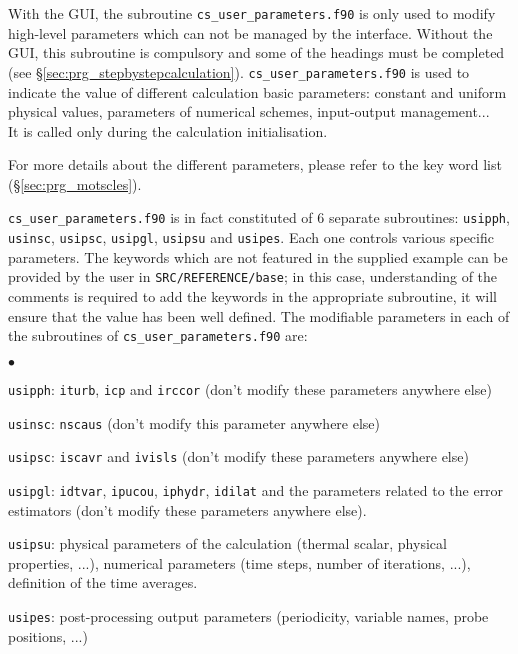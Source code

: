 {{With the GUI, the subroutine \texttt{cs\_user\_parameters.f90} is only
used to modify high-level parameters which can not be managed by the
interface. Without the GUI, this
subroutine is compulsory and some of the headings must be completed (see \S\ref{sec:prg_stepbystepcalculation}).
\texttt{cs\_user\_parameters.f90}
is used to indicate the value of different calculation
basic parameters: constant and uniform physical values, parameters of
numerical schemes, input-output management...\\
It is called only during the calculation initialisation.

For more details about the different parameters, please refer to the key
word list (\S\ref{sec:prg_motscles}).

\texttt{cs\_user\_parameters.f90} is in fact constituted of 6 separate subroutines:  \texttt{usipph},
 \texttt{usinsc}, \texttt{usipsc}, \texttt{usipgl},
\texttt{usipsu} and \texttt{usipes}. Each one controls various
 specific parameters. The keywords which are not featured in the supplied example
can be provided by the user in \texttt{SRC/REFERENCE/base}; in this case,
understanding of the comments is required to add the keywords in the appropriate
subroutine, it will ensure that the value
has been well defined. The modifiable parameters in each of the subroutines of
\texttt{cs\_user\_parameters.f90} are:

\begin{list}{$\bullet$}{}
\item \texttt{usipph}: \texttt{iturb}, \texttt{icp} and \texttt{irccor} (don't modify these
      parameters anywhere else)
\item \texttt{usinsc}: \texttt{nscaus} (don't modify this parameter anywhere
      else)
\item \texttt{usipsc}: \texttt{iscavr} and \texttt{ivisls} (don't modify these
      parameters anywhere else)
\item \texttt{usipgl}: \texttt{idtvar}, \texttt{ipucou}, \texttt{iphydr}, \texttt{idilat} and the
      parameters related to the error estimators (don't modify these parameters
      anywhere else).
\item \texttt{usipsu}: physical parameters of the calculation (thermal scalar, physical
      properties, ...), numerical parameters (time steps, number of iterations, ...),
      definition of the time averages.
\item \texttt{usipes}: post-processing output parameters (periodicity, variable names,
      probe positions, ...)
\end{list}

}}
